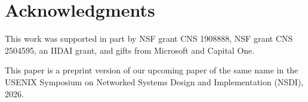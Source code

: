 \section*{Acknowledgments}
This work was supported in part by NSF grant CNS 1908888, NSF grant CNS 2504595, an IIDAI grant, and gifts from Microsoft and Capital One.

This paper is a preprint version of our upcoming paper of the same name in the USENIX Symposium on Networked Systems Design and Implementation (NSDI), 2026.
